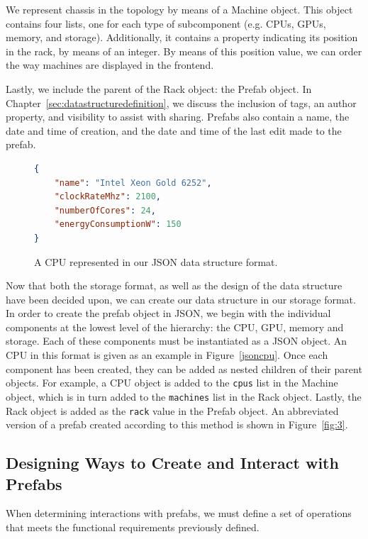 \documentclass[11pt]{article}
\begin{document}
			We represent chassis in the topology by means of a Machine object. 
			This object contains four lists, one for each type of subcomponent (e.g. CPUs, GPUs, memory, and storage).
			Additionally, it contains a property indicating its position in the rack, by means of an integer.
			By means of this position value, we can order the way machines are displayed in the \opendc{} frontend.

			Lastly, we include the parent of the Rack object: the Prefab object.
			In Chapter~\ref{sec:datastructuredefinition}, we discuss the inclusion of tags, an author property, and visibility to assist with sharing.
			Prefabs also contain a name, the date and time of creation, and the date and time of the last edit made to the prefab.

			\bigbreak
			\begin{figure}[h]
			\centering
				\begin{lstlisting}[language=json]
{
	"name": "Intel Xeon Gold 6252",
	"clockRateMhz": 2100,
	"numberOfCores": 24,
	"energyConsumptionW": 150
}
			\end{lstlisting}
				\caption[A JSON representation of a CPU]{A CPU represented in our JSON data structure format.}
				\label{fig:jsoncpu}
			\end{figure}

			Now that both the storage format, as well as the design of the data structure have been decided upon, we can create our data structure in our storage format.
			In order to create the prefab object in JSON, we begin with the individual components at the lowest level of the hierarchy: the CPU, GPU, memory and storage.
			Each of these components must be instantiated as a JSON object.
			An CPU in this format is given as an example in Figure~\ref{jsoncpu}.
			Once each component has been created, they can be added as nested children of their parent objects.
			For example, a CPU object is added to the \verb|cpus| list in the Machine object, which is in turn added to the \verb|machines| list in the Rack object.
			Lastly, the Rack object is added as the \verb|rack| value in the Prefab object.
			An abbreviated version of a prefab created according to this method is shown in Figure~\ref{fig:3}.
			



	\subsection{Designing Ways to Create and Interact with Prefabs}
		When determining interactions with prefabs, we must define a set of operations that meets the functional requirements previously defined.
		
\end{document}
